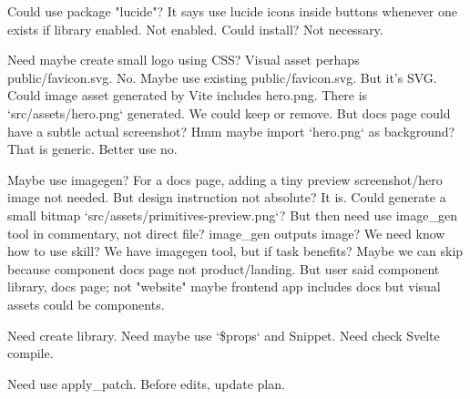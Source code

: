 \begin{decodedreasoningpanel}
Could use package "lucide"? It says use lucide icons inside buttons whenever one exists if library enabled. Not enabled. Could install? Not necessary.

Need maybe create small logo using CSS? Visual asset perhaps public/favicon.svg. No. Maybe use existing public/favicon.svg. But it's SVG. Could image asset generated by Vite includes hero.png. There is `src/assets/hero.png` generated. We could keep or remove. But docs page could have a subtle actual screenshot? Hmm maybe import `hero.png` as background? That is generic. Better use no.

Maybe use imagegen? For a docs page, adding a tiny preview screenshot/hero image not needed. But design instruction not absolute? It is. Could generate a small bitmap `src/assets/primitives-preview.png`? But then need use image\_gen tool in commentary, not direct file? image\_gen outputs image? We need know how to use skill? We have imagegen tool, but if task benefits? Maybe we can skip because component docs page not product/landing. But user said component library, docs page; not "website" maybe frontend app
includes docs but visual assets could be components.

Need create library. Need maybe use `\$props` and Snippet. Need check Svelte compile.

Need use apply\_patch. Before edits, update plan.
\end{decodedreasoningpanel}
